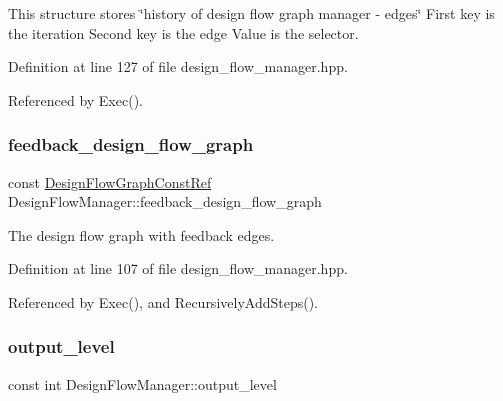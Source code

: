 This structure stores \char`\"{}history of design flow graph manager -\/ edges\char`\"{} First key is the iteration Second key is the edge Value is the selector. 



Definition at line 127 of file design\+\_\+flow\+\_\+manager.\+hpp.



Referenced by Exec().

\mbox{\label{classDesignFlowManager_a733e1430234354a0e6c87e49f1967cf3}} 
\subsubsection{\texorpdfstring{feedback\+\_\+design\+\_\+flow\+\_\+graph}{feedback\_design\_flow\_graph}}
{\footnotesize\ttfamily const \hyperlink{design__flow__graph_8hpp_a0230319e566e6824d3d187b6871598f7}{Design\+Flow\+Graph\+Const\+Ref} Design\+Flow\+Manager\+::feedback\+\_\+design\+\_\+flow\+\_\+graph\hspace{0.3cm}{\ttfamily [private]}}



The design flow graph with feedback edges. 



Definition at line 107 of file design\+\_\+flow\+\_\+manager.\+hpp.



Referenced by Exec(), and Recursively\+Add\+Steps().

\mbox{\label{classDesignFlowManager_ad7b7d5778dda58ed7bd03a1f4a609279}} 
\subsubsection{\texorpdfstring{output\+\_\+level}{output\_level}}
{\footnotesize\ttfamily const int Design\+Flow\+Manager\+::output\+\_\+level\hspace{0.3cm}{\ttfamily [private]}}



